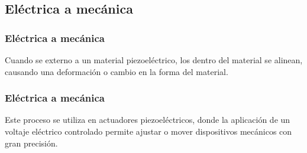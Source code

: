 \documentclass[14pt]{beamer}
\begin{document}
\subsection{Eléctrica a mecánica}

\begin{frame}
\frametitle{Eléctrica a mecánica}
Cuando se  externo a un material piezoeléctrico, \pause los  dentro del material se alinean, \pause causando una deformación o cambio en la forma del material.
\end{frame}
\begin{frame}
\frametitle{Eléctrica a mecánica}
Este proceso se utiliza en actuadores piezoeléctricos, \pause donde la aplicación de un voltaje eléctrico controlado permite ajustar o mover dispositivos mecánicos con gran precisión.
\end{frame}
\end{document}
